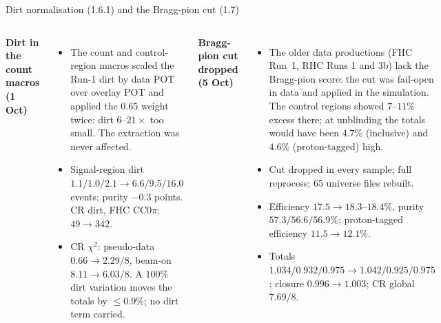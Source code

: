 \documentclass[aspectratio=169,10pt]{beamer}
\begin{document}
\begin{frame}{Dirt normalisation (1.6.1) and the Bragg-pion cut (1.7)}
  \begin{columns}[T]
  \textbf{\color{ubred}Dirt in the count macros (1 Oct)}
  \begin{itemize}\footnotesize\setlength\itemsep{2pt}
    \item The count and control-region macros scaled the Run-1 dirt by data POT over overlay POT and applied the
          $0.65$ weight twice: dirt $6$--$21\times$ too small. The extraction was never affected.
    \item Signal-region dirt $1.1/1.0/2.1\to6.6/9.5/16.0$ events; purity $-0.3$ points. CR dirt, FHC CC$0\pi$:
          $49\to342$.
    \item CR $\chi^2$: pseudo-data $0.66\to2.29/8$, beam-on $8.11\to6.03/8$. A $100\%$ dirt variation moves the
          totals by $\leq0.9\%$; no dirt term carried.
  \end{itemize}
  \textbf{\color{ubred}Bragg-pion cut dropped (5 Oct)}
  \begin{itemize}\footnotesize\setlength\itemsep{2pt}
    \item The older data productions (FHC Run~1, RHC Runs 1 and 3b) lack the Bragg-pion score: the cut was
          fail-open in data and applied in the simulation. The control regions showed $7$--$11\%$ excess there;
          at unblinding the totals would have been $4.7\%$ (inclusive) and $4.6\%$ (proton-tagged) high.
    \item Cut dropped in every sample; full reprocess; 65 universe files rebuilt.
    \item Efficiency $17.5\to18.3$--$18.4\%$, purity $57.3/56.6/56.9\%$; proton-tagged efficiency $11.5\to12.1\%$.
    \item Totals $1.034/0.932/0.975\to1.042/0.925/0.975$; closure $0.996\to1.003$; CR global $7.69/8$.
  \end{itemize}
  \end{columns}
\end{frame}
\end{document}
